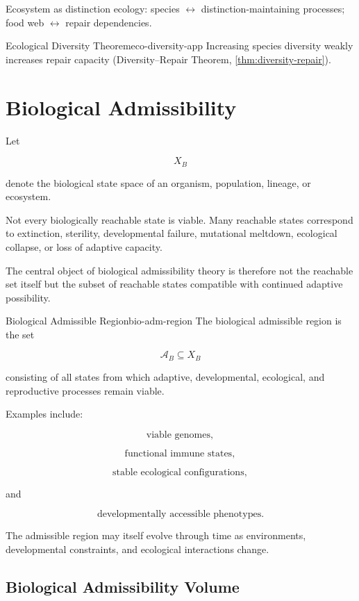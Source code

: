 \documentclass[12pt,twoside,openright]{book}
\begin{document}
Ecosystem as distinction ecology:
species $\leftrightarrow$ distinction-maintaining processes;
food web $\leftrightarrow$ repair dependencies.

\begin{theorem}{Ecological Diversity Theorem}{eco-diversity-app}
  Increasing species diversity weakly increases repair
  capacity (Diversity--Repair Theorem,
  \cref{thm:diversity-repair}).
\end{theorem}

\section{Biological Admissibility}

Let

\[
X_B
\]

denote the biological state space of an organism,
population, lineage, or ecosystem.

Not every biologically reachable state is viable.
Many reachable states correspond to extinction,
sterility, developmental failure, mutational meltdown,
ecological collapse, or loss of adaptive capacity.

The central object of biological admissibility theory is
therefore not the reachable set itself but the subset of
reachable states compatible with continued adaptive
possibility.

\begin{definition}{Biological Admissible Region}{bio-adm-region}
The biological admissible region is the set

\[
\mathcal A_B
\subseteq
X_B
\]

consisting of all states from which adaptive,
developmental, ecological, and reproductive processes
remain viable.
\end{definition}

Examples include:

\[
\text{viable genomes},
\]

\[
\text{functional immune states},
\]

\[
\text{stable ecological configurations},
\]

and

\[
\text{developmentally accessible phenotypes}.
\]

The admissible region may itself evolve through time as
environments, developmental constraints, and ecological
interactions change.

\subsection{Biological Admissibility Volume}
\end{document}
